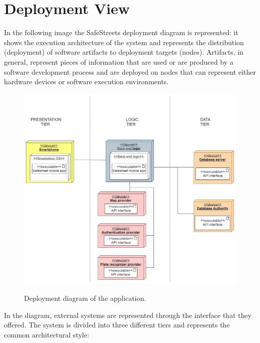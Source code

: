 \documentclass[../RASD.tex]{subfiles}
\begin{document}
    \section{Deployment View}\label{sec:deployment-view}
    In the following image the SafeStreets deployment diagram is represented: it shows the execution architecture of the system
    and represents the distribution (deployment) of software artifacts to deployment targets (nodes).
    Artifacts, in general, represent pieces of information that are used or are produced by a software development process and are deployed on nodes
    that can represent either hardware devices or software execution environments.
    \begin{figure}[H]
        \centering
        \includegraphics[scale = 1]{assets/deployment.png}\\[1.6 cm]
        \caption[\textit{Deployment} Diagram]{Deployment diagram of the application.}
    \end{figure}
    In the diagram, external systems are represented through the interface that they offered.
    The system is divided into three different tiers and represents the common architectural style:
\end{document}
